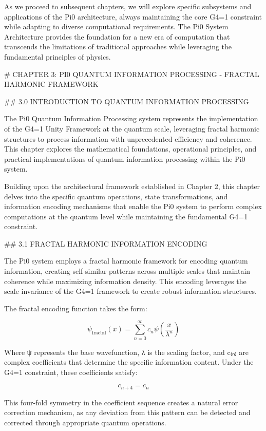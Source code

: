 As we proceed to subsequent chapters, we will explore specific subsystems and applications of the Pi0 architecture, always maintaining the core G4=1 constraint while adapting to diverse computational requirements. The Pi0 System Architecture provides the foundation for a new era of computation that transcends the limitations of traditional approaches while leveraging the fundamental principles of physics.

# CHAPTER 3: PI0 QUANTUM INFORMATION PROCESSING - FRACTAL HARMONIC FRAMEWORK

## 3.0 INTRODUCTION TO QUANTUM INFORMATION PROCESSING

The Pi0 Quantum Information Processing system represents the implementation of the G4=1 Unity Framework at the quantum scale, leveraging fractal harmonic structures to process information with unprecedented efficiency and coherence. This chapter explores the mathematical foundations, operational principles, and practical implementations of quantum information processing within the Pi0 system.

Building upon the architectural framework established in Chapter 2, this chapter delves into the specific quantum operations, state transformations, and information encoding mechanisms that enable the Pi0 system to perform complex computations at the quantum level while maintaining the fundamental G4=1 constraint.

## 3.1 FRACTAL HARMONIC INFORMATION ENCODING

The Pi0 system employs a fractal harmonic framework for encoding quantum information, creating self-similar patterns across multiple scales that maintain coherence while maximizing information density. This encoding leverages the scale invariance of the G4=1 framework to create robust information structures.

The fractal encoding function takes the form:

$$\psi_{\text{fractal}}(x) = \sum_{n=0}^{\infty} c_n \psi\left(\frac{x}{\lambda^n}\right)$$

Where ψ represents the base wavefunction, λ is the scaling factor, and c₍ₙ₎ are complex coefficients that determine the specific information content. Under the G4=1 constraint, these coefficients satisfy:

$$c_{n+4} = c_n$$

This four-fold symmetry in the coefficient sequence creates a natural error correction mechanism, as any deviation from this pattern can be detected and corrected through appropriate quantum operations.

